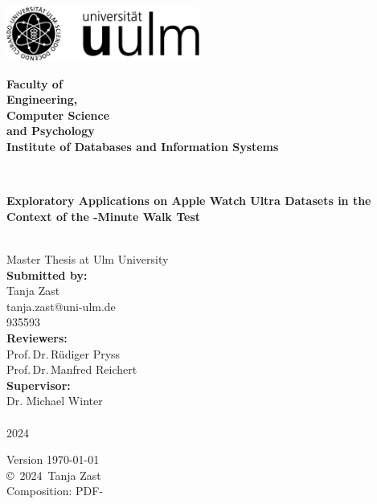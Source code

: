 \documentclass[a4paper,12pt,
headsepline,           %
oneside,               %
pointlessnumbers,      %
bibtotoc,              %
BCOR15mm               %
]{scrbook}
\makeatletter
\newcommand{\fullname}{Tanja Zast}
\newcommand{\email}{tanja.zast@uni-ulm.de}
\newcommand{\titel}{Exploratory Applications on Apple Watch Ultra Datasets in the Context of the \newline
6-Minute Walk Test}
\newcommand{\jahr}{2024}
\newcommand{\matnr}{935593}
\newcommand{\gutachterA}{Prof.\,Dr.\,Rüdiger Pryss}
\newcommand{\gutachterB}{Prof.\,Dr.\,Manfred Reichert}
\newcommand{\betreuer}{Dr. Michael Winter}
\newcommand{\fakultaet}{Engineering, \\ Computer Science \\ and Psychology}
\newcommand{\institut}{Institute of Databases and Information Systems}
\makeatother
\begin{document}
\frontmatter

\thispagestyle{empty}
\begin{addmargin*}[4mm]{-10mm}

\hfill
\includegraphics[height=1.8cm]{images/logo_uulm_sw.png}\\[1em]

{\footnotesize
\hspace*{115mm}\parbox[t]{35mm}{\bfseries Faculty of\\
\fakultaet\\
\mdseries \institut}\\[2cm]

\parbox{140mm}{\bfseries \LARGE \titel}\\[2.5em]
{\footnotesize Master Thesis at Ulm University}\\[3em]

{\footnotesize \bfseries Submitted by:}\\
{\footnotesize \fullname\\ \email}\\ \matnr\\[2em]
{\footnotesize \bfseries Reviewers:}\\                     
{\footnotesize \gutachterA\\ \gutachterB}\\[2em]
{\footnotesize \bfseries Supervisor:}\\ 
{\footnotesize \betreuer}\\\\
{\footnotesize \jahr}
}
\end{addmargin*}


\clearpage
\thispagestyle{empty}
{ \small
  \flushleft
  Version \today \\\vfill
  \copyright~\jahr~\fullname\\[0.5em]
  Composition: PDF-\LaTeXe
}
\end{document}

